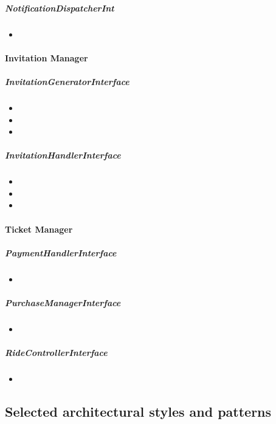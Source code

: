 		\subparagraph{NotificationDispatcherInt}
			\begin{itemize}
				\item {}
			\end{itemize}

	\paragraph{Invitation Manager}
		\subparagraph{InvitationGeneratorInterface}
			\begin{itemize}
				\item {}
				\item {}
				\item {}
			\end{itemize}

		\subparagraph{InvitationHandlerInterface}
			\begin{itemize}
				\item {}
				\item {}
				\item {}
			\end{itemize}

	\paragraph{Ticket Manager}
		\subparagraph{PaymentHandlerInterface}
			\begin{itemize}
				\item {}
			\end{itemize}
		\subparagraph{PurchaseManagerInterface}
			\begin{itemize}
				\item {}
			\end{itemize}
		\subparagraph{RideControllerInterface}
			\begin{itemize}
				\item {}
			\end{itemize}
\subsection{Selected architectural styles and patterns}


